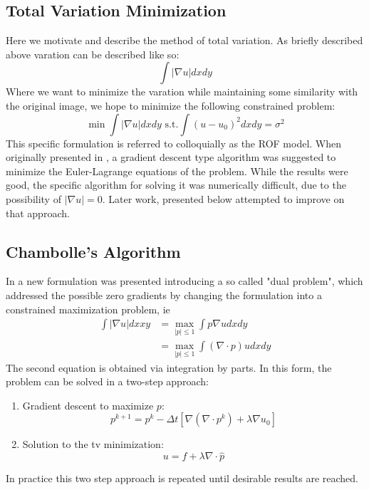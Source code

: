 \documentclass[11pt]{article}
\begin{document}
\subsection{Total Variation Minimization}
Here we motivate and describe the method of total variation.
As briefly described above varation can be described like so:
\begin{equation*}
\int |\nabla u| dx dy
\end{equation*}
Where we want to minimize the varation while maintaining some similarity with the original image, we hope to minimize the following constrained problem:
\begin{equation*}
\min \int |\nabla u| dx dy \text{ s.t.} \int (u-u_0)^2 dxdy = \sigma^2
\end{equation*}
This specific formulation is referred to colloquially as the ROF model.
When originally presented in \cite{rudin1992nonlinear}, a gradient descent type algorithm was suggested to minimize the Euler-Lagrange equations of the problem.
While the results were good, the specific algorithm for solving it was numerically difficult, due to the possibility of $|\nabla u|=0$.
Later work, presented below attempted to improve on that approach.

\subsection{Chambolle's Algorithm}
In \cite{chambolle2004algorithm} a new formulation was presented introducing a so called "dual problem", which addressed the possible zero gradients by changing the formulation into a constrained maximization problem, ie
\begin{align*}
\int |\nabla u| dx xy &= \max_{|p| \le 1} \int p \nabla u dx dy \\
&= \max_{|p| \le 1} \int (\nabla \cdot p) u dx dy
\end{align*}
The second equation is obtained via integration by parts.  
In this form, the problem can be solved in a two-step approach:
\begin{enumerate}
\item
Gradient descent to maximize $p$:
\begin{equation}
p^{k+1} = p^{k} - \Delta t \left[ \nabla( \nabla \cdot p^{k}) + \lambda \nabla u_0 \right]
\label{ch:dual}
\end{equation}
\item Solution to the tv minimization:
\begin{equation}
u = f + \lambda \nabla \cdot \hat{p}
\label{ch:primal}
\end{equation}
\end{enumerate}
In practice this two step approach is repeated until desirable results are reached.
\end{document}
